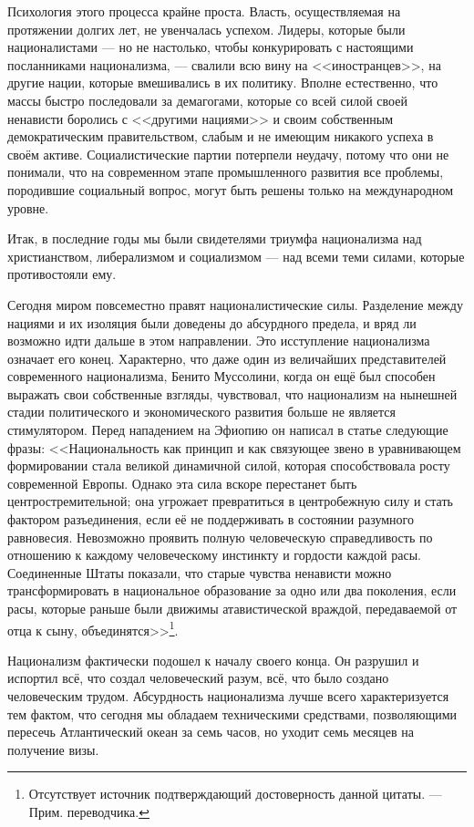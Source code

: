 Психология этого процесса крайне проста. Власть, осуществляемая на протяжении долгих лет, не увенчалась успехом. Лидеры, которые были националистами — но не настолько, чтобы конкурировать с настоящими посланниками национализма, — свалили всю вину на <<иностранцев>>, на другие нации, которые вмешивались в их политику. Вполне естественно, что массы быстро последовали за демагогами, которые со всей силой своей ненависти боролись с <<другими нациями>> и своим собственным демократическим правительством, слабым и не имеющим никакого успеха в своём активе. Социалистические партии потерпели неудачу, потому что они не понимали, что на современном этапе промышленного развития все проблемы, породившие социальный вопрос, могут быть решены только на международном уровне.

Итак, в последние годы мы были свидетелями триумфа национализма над христианством, либерализмом и социализмом — над всеми теми силами, которые противостояли ему.

Сегодня миром повсеместно правят националистические силы. Разделение между нациями и их изоляция были доведены до абсурдного предела, и вряд ли возможно идти дальше в этом направлении. Это исступление национализма означает его конец. Характерно, что даже один из величайших представителей современного национализма, Бенито Муссолини, когда он ещё был способен выражать свои собственные взгляды, чувствовал, что национализм на нынешней стадии политического и экономического развития больше не является стимулятором. Перед нападением на Эфиопию он написал в статье следующие фразы: <<Национальность как принцип и как связующее звено в уравнивающем формировании стала великой динамичной силой, которая способствовала росту современной Европы. Однако эта сила вскоре перестанет быть центростремительной; она угрожает превратиться в центробежную силу и стать фактором разъединения, если её не поддерживать в состоянии разумного равновесия. Невозможно проявить полную человеческую справедливость по отношению к каждому человеческому инстинкту и гордости каждой расы. Соединенные Штаты показали, что старые чувства ненависти можно трансформировать в национальное образование за одно или два поколения, если расы, которые раньше были движимы атавистической враждой, передаваемой от отца к сыну, объединятся>>\footnote{%
Отсутствует источник подтверждающий достоверность данной цитаты. — Прим. переводчика.}.

Национализм фактически подошел к началу своего конца. Он разрушил и испортил всё, что создал человеческий разум, всё, что было создано человеческим трудом. Абсурдность национализма лучше всего характеризуется тем фактом, что сегодня мы обладаем техническими средствами, позволяющими пересечь Атлантический океан за семь часов, но уходит семь месяцев на получение визы.

